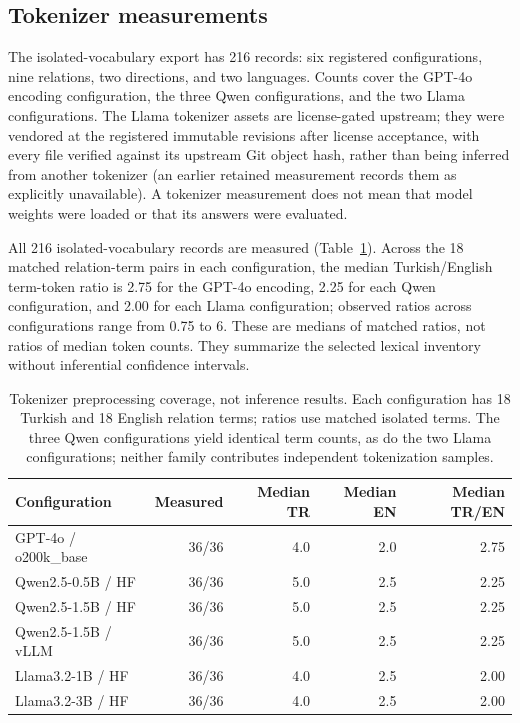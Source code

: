\subsection{Tokenizer measurements}

The isolated-vocabulary export has 216 records: six registered configurations, nine relations, two
directions, and two languages. Counts cover the GPT-4o encoding configuration, the three Qwen
configurations, and the two Llama configurations. The Llama tokenizer assets are license-gated upstream;
they were vendored at the registered immutable revisions after license acceptance, with every file verified
against its upstream Git object hash, rather than being inferred from another tokenizer (an earlier retained
measurement records them as explicitly unavailable). A tokenizer measurement does not mean that model
weights were loaded or that its answers were evaluated.

All 216 isolated-vocabulary records are measured (Table~\ref{tab:tokenizers}). Across the 18 matched
relation-term pairs in each configuration, the median Turkish/English term-token ratio is 2.75 for
the GPT-4o encoding, 2.25 for each Qwen configuration, and 2.00 for each Llama configuration; observed
ratios across configurations range from 0.75 to 6. These are medians of matched ratios, not ratios of
median token counts. They summarize the selected lexical inventory without inferential confidence
intervals.

\begin{table}[t]
  \centering
  \caption{Tokenizer preprocessing coverage, not inference results. Each configuration has 18 Turkish and 18
  English relation terms; ratios use matched isolated terms. The three Qwen configurations yield identical
  term counts, as do the two Llama configurations; neither family contributes independent tokenization
  samples.}
  \label{tab:tokenizers}
  \small
  \begin{tabular}{@{}lrrrr@{}}
    \toprule
    Configuration & Measured & Median TR & Median EN & Median TR/EN \\
    \midrule
    GPT-4o / o200k\_base  & 36/36 & 4.0 & 2.0 & 2.75 \\
    Qwen2.5-0.5B / HF     & 36/36 & 5.0 & 2.5 & 2.25 \\
    Qwen2.5-1.5B / HF     & 36/36 & 5.0 & 2.5 & 2.25 \\
    Qwen2.5-1.5B / vLLM   & 36/36 & 5.0 & 2.5 & 2.25 \\
    Llama3.2-1B / HF      & 36/36 & 4.0 & 2.5 & 2.00 \\
    Llama3.2-3B / HF      & 36/36 & 4.0 & 2.5 & 2.00 \\
    \bottomrule
  \end{tabular}
\end{table}

